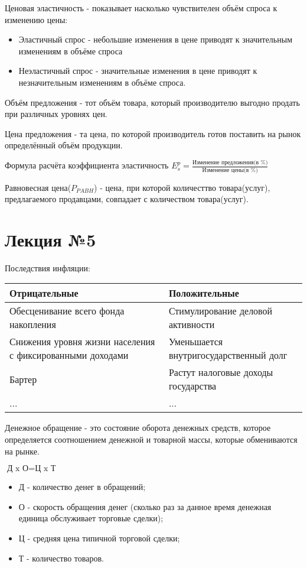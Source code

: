 \documentclass[a4paper, 12pt]{article}
\begin{document}
	Ценовая эластичность - показывает насколько чувствителен объём спроса к изменению цены:
	\begin{itemize}
		\item Эластичный спрос - небольшие изменения в цене приводят к значительным изменениям в объёме спроса
		\item Неэластичный спрос - значительные изменения в цене приводят к незначительным изменениям в объёме спроса.
	\end{itemize}

	Объём предложения - тот объём товара, который производителю выгодно продать при различных уровнях цен.
	
	Цена предложения - та цена, по которой производитель готов поставить на рынок определённый объём продукции.
	
	Формула расчёта коэффициента эластичность $E^p_s = \frac{\text{Изменение предложения(в \%)}}{\text{Изменение цены(в \%)}}$
	
	Равновесная цена($P_{PABH}$) - цена, при которой количесттво товара(услуг), предлагаемого продавцами, совпадает с количеством товара(услуг).
	
	\section{Лекция №5}
	
	Последствия инфляции:
	\begin{center}
		\begin{tabular}{ | m{10em} | m{10em} | }
			\hline
			Отрицательные & Положительные \\
			\hline
			Обесценивание всего фонда накопления & Стимулирование деловой активности \\
			\hline
			Снижения уровня жизни населения с фиксированными доходами & Уменьшается внутригосударственный долг \\
			\hline
			Бартер & Растут налоговые доходы государства \\
			\hline
			... & ... \\
			\hline
		\end{tabular}
	\end{center}

	Денежное обращение - это состояние оборота денежных средств, которое определяется соотношением денежной и товарной массы, которые обмениваются на рынке.
	
	$\text{Д x О} = \text{Ц x Т}$
	
	\begin{itemize}
		\item Д - количество денег в обращений;
		\item О - скорость обращения денег (сколько раз за данное время денежная единица обслуживает торговые сделки);
		\item Ц - средняя цена типичной торговой сделки;
		\item Т - количество товаров.
	\end{itemize}
\end{document}
